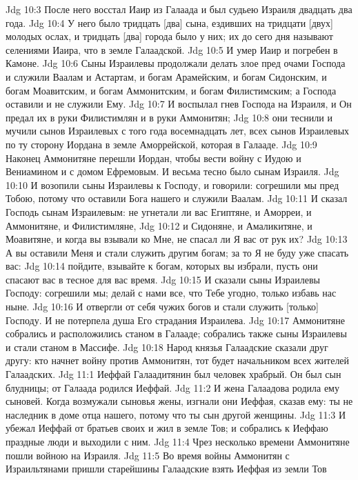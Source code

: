 \vs Jdg 10:3 После него восстал Иаир из Галаада и был судьею Израиля двадцать два года.
\vs Jdg 10:4 У него было тридцать [два] сына, ездивших на тридцати [двух] молодых ослах, и тридцать [два] города было у них; их до сего дня называют селениями Иаира, что в земле Галаадской.
\vs Jdg 10:5 И умер Иаир и погребен в Камоне.
\rsbpar\vs Jdg 10:6 Сыны Израилевы продолжали делать злое пред очами Господа и служили Ваалам и Астартам, и богам Арамейским, и богам Сидонским, и богам Моавитским, и богам Аммонитским, и богам Филистимским; а Господа оставили и не служили Ему.
\vs Jdg 10:7 И воспылал гнев Господа на Израиля, и Он предал их в руки Филистимлян и в руки Аммонитян;
\vs Jdg 10:8 они теснили и мучили сынов Израилевых с того года восемнадцать лет, всех сынов Израилевых по ту сторону Иордана в земле Аморрейской, которая в Галааде.
\vs Jdg 10:9 Наконец Аммонитяне перешли Иордан, чтобы вести войну с Иудою и Вениамином и с домом Ефремовым. И весьма тесно было сынам Израиля.
\vs Jdg 10:10 И возопили сыны Израилевы к Господу, и говорили: согрешили мы пред Тобою, потому что оставили Бога нашего и служили Ваалам.
\vs Jdg 10:11 И сказал Господь сынам Израилевым: не угнетали ли вас Египтяне, и Аморреи, и Аммонитяне, и Филистимляне,
\vs Jdg 10:12 и Сидоняне, и Амаликитяне, и Моавитяне, и когда вы взывали ко Мне, не спасал ли Я вас от рук их?
\vs Jdg 10:13 А вы оставили Меня и стали служить другим богам; за то Я не буду уже спасать вас:
\vs Jdg 10:14 пойдите, взывайте к богам, которых вы избрали, пусть они спасают вас в тесное для вас время.
\vs Jdg 10:15 И сказали сыны Израилевы Господу: согрешили мы; делай с нами все, что Тебе угодно, только избавь нас ныне.
\vs Jdg 10:16 И отвергли от себя чужих богов и стали служить [только] Господу. И не потерпела душа Его страдания Израилева.
\vs Jdg 10:17 Аммонитяне собрались и расположились станом в Галааде; собрались также сыны Израилевы и стали станом в Массифе.
\vs Jdg 10:18 Народ  князья Галаадские сказали друг другу: кто начнет войну против Аммонитян, тот будет начальником всех жителей Галаадских.
\vs Jdg 11:1 Иеффай Галаадитянин был человек храбрый. Он был сын блудницы; от Галаада родился Иеффай.
\vs Jdg 11:2 И жена Галаадова родила ему сыновей. Когда возмужали сыновья жены, изгнали они Иеффая, сказав ему: ты не наследник в доме отца нашего, потому что ты сын другой женщины.
\vs Jdg 11:3 И убежал Иеффай от братьев своих и жил в земле Тов; и собрались к Иеффаю праздные люди и выходили с ним.
\rsbpar\vs Jdg 11:4 Чрез несколько времени Аммонитяне пошли войною на Израиля.
\vs Jdg 11:5 Во время войны Аммонитян с Израильтянами пришли старейшины Галаадские взять Иеффая из земли Тов
